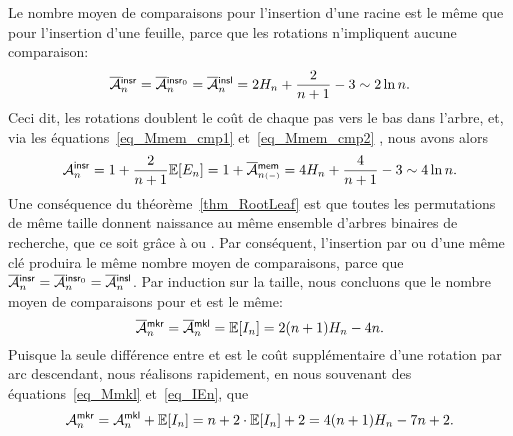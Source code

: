 Le nombre moyen de comparaisons pour l'insertion d'une racine est le
même que pour l'insertion d'une feuille, parce que les rotations
n'impliquent aucune comparaison:
\begin{equation*}
\OM{\fun{insr}}{n} = \OM{\fun{insr}_0}{n} = \OM{\fun{insl}}{n}
= 2H_n + \frac{2}{n+1} - 3 \sim 2\ln n.
\index{insr@$\OM{\fun{insr}}{n}$}
\index{insr0@$\OM{\fun{insr}_0}{n}$}
\end{equation*}
Ceci dit, les rotations doublent le coût de chaque pas vers le bas
dans l'arbre, et, via les équations~\eqref{eq_Mmem_cmp1}
et~\eqref{eq_Mmem_cmp2} , nous avons alors
\begin{equation*}
\M{\fun{insr}}{n} = 1 + \frac{2}{n+1}\Expected{E_n} = 1 +
\OM{\fun{mem}}{n{\scriptscriptstyle(-)}} = 4H_n + \frac{4}{n+1} - 3
\sim 4\ln n.
\index{insr@$\M{\fun{insr}}{n}$}
\end{equation*}
Une conséquence du théorème~\eqref{thm_RootLeaf}
 est que toutes les permutations de même taille
donnent naissance au même ensemble d'arbres binaires de recherche, que
ce soit grâce à  ou . Par conséquent,
l'insertion par  ou  d'une même clé produira
le même nombre moyen de comparaisons, parce que \(\OM{\fun{insr}}{n} =
\OM{\fun{insr}_0}{n} = \OM{\fun{insl}}{n}\). Par induction sur la
taille, nous concluons que le nombre moyen de comparaisons pour
 et  est le même:
\begin{equation*}
\OM{\fun{mkr}}{n} = \OM{\fun{mkl}}{n} = \Expected{I_n}
= 2(n+1)H_n - 4n.
\index{mkr@$\OM{\fun{mkr}}{n}$}
\end{equation*}
Puisque la seule différence entre  et  est le
coût supplémentaire d'une rotation par arc descendant, nous réalisons
rapidement, en nous souvenant des équations~\eqref{eq_Mmkl}
et~\eqref{eq_IEn}, que
\begin{equation*}
\M{\fun{mkr}}{n} = \M{\fun{mkl}}{n} + \Expected{I_n}
= n + 2 \cdot \Expected{I_n} + 2 = 4(n+1)H_n - 7n + 2.
\index{mkr@$\M{\fun{mkr}}{n}$}
\end{equation*}


